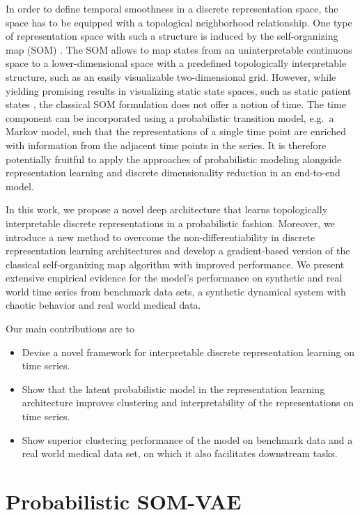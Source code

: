 In order to define temporal smoothness in a discrete representation space, the space has to be equipped with a topological neighborhood relationship.
One type of representation space with such a structure is induced by the self-organizing map (SOM) \citep{Kohonen1998}.
The SOM allows to map states from an uninterpretable continuous space to a lower-dimensional space with a predefined topologically interpretable structure, such as an easily visualizable two-dimensional grid.
However, while yielding promising results in visualizing static state spaces, such as static patient states \citep{Tirunagari2015}, the classical SOM formulation does not offer a notion of time.
The time component can be incorporated using a probabilistic transition model, e.g.\ a Markov model, such that the representations of a single time point are enriched with information from the adjacent time points in the series.
It is therefore potentially fruitful to apply the approaches of probabilistic modeling alongside representation learning and discrete dimensionality reduction in an end-to-end model.

In this work, we propose a novel deep architecture that learns topologically interpretable discrete representations in a probabilistic fashion.
Moreover, we introduce a new method to overcome the non-differentiability in discrete representation learning architectures and develop a gradient-based version of the classical self-organizing map algorithm with improved performance.
We present extensive empirical evidence for the model's performance on synthetic and real world time series from benchmark data sets, a synthetic dynamical system with chaotic behavior and real world medical data.

Our main contributions are to

\begin{itemize}
	\item Devise a novel framework for interpretable discrete representation learning on time series.
	\item Show that the latent probabilistic model in the representation learning architecture improves clustering and interpretability of the representations on time series.
	\item Show superior clustering performance of the model on benchmark data and a real world medical data set, on which it also facilitates downstream tasks.
\end{itemize}
\FloatBarrier

\section{Probabilistic SOM-VAE}

